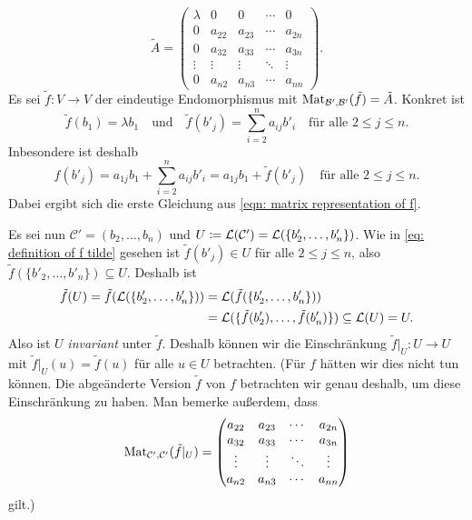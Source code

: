 \documentclass[a4paper,10pt]{scrartcl}
\begin{document}
\[
 \tilde{A}
 =
 \begin{pmatrix}
  \lambda & 0      & 0      & \cdots & 0      \\
  0       & a_{22} & a_{23} & \cdots & a_{2n} \\
  0       & a_{32} & a_{33} & \cdots & a_{3n} \\
  \vdots  & \vdots & \vdots & \ddots & \vdots \\
  0       & a_{n2} & a_{n3} & \cdots & a_{nn}
 \end{pmatrix}.
\]
Es sei $\tilde{f} \colon V \to V$ der eindeutige Endomorphismus mit $\mathrm{Mat}_{\mathcal{B}',\mathcal{B}'}(\tilde{f}) = \tilde{A}$. Konkret ist
\begin{equation}\label{eq: definition of f tilde}
 \tilde{f}(b_1) = \lambda b_1
 \quad\text{und}\quad
 \tilde{f}(b'_j) = \sum_{i=2}^n a_{ij} b'_i
 \quad\text{für alle $2 \leq j \leq n$}.
\end{equation}
Inbesondere ist deshalb
\begin{equation}\label{eqn: connection between f and f tilde}
 f(b'_j)
 = a_{1j} b_1 + \sum_{i=2}^n a_{ij} b'_i
 = a_{1j} b_1 + \tilde{f}(b'_j)
 \quad\text{für alle $2 \leq j \leq n$}.
\end{equation}
Dabei ergibt sich die erste Gleichung aus \eqref{eqn: matrix representation of f}.

Es sei nun $\mathcal{C}' = (b_2, \dotsc, b_n)$ und $U \coloneqq \mathcal{L}(\mathcal{C}') = \mathcal{L}(\{b'_2, \dotsc, b'_n\})$. Wie in \eqref{eq: definition of f tilde} gesehen ist $\tilde{f}(b'_j) \in U$ für alle $2 \leq j \leq n$, also $\tilde{f}(\{b'_2, \dotsc, b'_n\}) \subseteq U$. Deshalb ist
\begin{align*}
   \tilde{f}(U)
 = \tilde{f}(\mathcal{L}(\{b'_2, \dotsc, b'_n\}))
 &= \mathcal{L}(\tilde{f}(\{b'_2, \dotsc, b'_n\})) \\
 &= \mathcal{L}(\{\tilde{f}(b'_2), \dotsc, \tilde{f}(b'_n)\})
 \subseteq \mathcal{L}(U)
 = U.
\end{align*}
Also ist $U$ \emph{invariant} unter $\tilde{f}$. Deshalb können wir die Einschränkung $\tilde{f}|_U \colon U \to U$ mit $\tilde{f}|_U(u)= \tilde{f}(u)$ für alle $u \in U$ betrachten. (Für $f$ hätten wir dies nicht tun können. Die abgeänderte Version $\tilde{f}$ von $f$ betrachten wir genau deshalb, um diese Einschränkung zu haben. Man bemerke außerdem, dass
\begin{equation}\label{eqn: matrix representation of the restriction}
 \mathrm{Mat}_{\mathcal{C}',\mathcal{C}'}(\tilde{f}|_U)
 =
 \begin{pmatrix}
  a_{22} & a_{23} & \cdots & a_{2n} \\
  a_{32} & a_{33} & \cdots & a_{3n} \\
  \vdots & \vdots & \ddots & \vdots \\
  a_{n2} & a_{n3} & \cdots & a_{nn}
 \end{pmatrix}
\end{equation}
gilt.)
\end{document}
